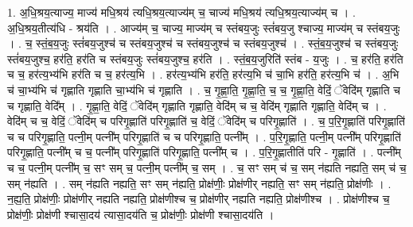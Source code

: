 \documentclass[17pt]{extarticle}
\begin{document}
1. अ॒धि॒श्रय॒त्याज्य॒ माज्य॑ मधि॒श्रय॑ त्यधि॒श्रय॒त्याज्य॑म् च॒ चाज्य॑ मधि॒श्रय॑ त्यधि॒श्रय॒त्याज्य॑म् च । . अ॒धि॒श्रय॒तीत्य॑धि - श्रय॑ति । . आज्य॑म् च॒ चाज्य॒ माज्य॑म् च स्तंबय॒जुः स्तं॑बय॒जु श्चाज्य॒ माज्य॑म् च स्तंबय॒जुः । . च॒ स्तं॒ब॒य॒जुः स्तं॑बय॒जुश्च॑ च स्तंबय॒जुश्च॑ च स्तंबय॒जुश्च॑ च स्तंबय॒जुश्च॑ । . स्तं॒ब॒य॒जुश्च॑ च स्तंबय॒जुः स्तं॑बय॒जुश्च॒ हर॑ति॒ हर॑ति च स्तंबय॒जुः स्तं॑बय॒जुश्च॒ हर॑ति । . स्तं॒ब॒य॒जुरिति॑ स्तंब - य॒जुः । . च॒ हर॑ति॒ हर॑ति च च॒ हर॑त्य॒भ्य॑भि हर॑ति च च॒ हर॑त्य॒भि । . हर॑त्य॒भ्य॑भि हर॑ति॒ हर॑त्य॒भि च॑ चा॒भि हर॑ति॒ हर॑त्य॒भि च॑ । . अ॒भि च॑ चा॒भ्य॑भि च॑ गृह्णाति गृह्णाति चा॒भ्य॑भि च॑ गृह्णाति । . च॒ गृ॒ह्णा॒ति॒ गृ॒ह्णा॒ति॒ च॒ च॒ गृ॒ह्णा॒ति॒ वेदिं॒ ॅवेदि॑म् गृह्णाति च च गृह्णाति॒ वेदि᳚म् । . गृ॒ह्णा॒ति॒ वेदिं॒ ॅवेदि॑म् गृह्णाति गृह्णाति॒ वेदि॑म् च च॒ वेदि॑म् गृह्णाति गृह्णाति॒ वेदि॑म् च । . वेदि॑म् च च॒ वेदिं॒ ॅवेदि॑म् च परिगृ॒ह्णाति॑ परिगृ॒ह्णाति॑ च॒ वेदिं॒ ॅवेदि॑म् च परिगृ॒ह्णाति॑ । . च॒ प॒रि॒गृ॒ह्णाति॑ परिगृ॒ह्णाति॑ च च परिगृ॒ह्णाति॒ पत्नी॒म् पत्नी᳚म् परिगृ॒ह्णाति॑ च च परिगृ॒ह्णाति॒ पत्नी᳚म् । . प॒रि॒गृ॒ह्णाति॒ पत्नी॒म् पत्नी᳚म् परिगृ॒ह्णाति॑ परिगृ॒ह्णाति॒ पत्नी᳚म् च च॒ पत्नी᳚म् परिगृ॒ह्णाति॑ परिगृ॒ह्णाति॒ पत्नी᳚म् च । . प॒रि॒गृ॒ह्णातीति॑ परि - गृ॒ह्णाति॑ । . पत्नी᳚म् च च॒ पत्नी॒म् पत्नी᳚म् च॒ सꣳ सम् च॒ पत्नी॒म् पत्नी᳚म् च॒ सम् । . च॒ सꣳ सम् च॑ च॒ सम् न॑ह्यति नह्यति॒ सम् च॑ च॒ सम् न॑ह्यति । . सम् न॑ह्यति नह्यति॒ सꣳ सम् न॑ह्यति॒ प्रोक्ष॑णीः॒ प्रोक्ष॑णीर् नह्यति॒ सꣳ सम् न॑ह्यति॒ प्रोक्ष॑णीः । . न॒ह्य॒ति॒ प्रोक्ष॑णीः॒ प्रोक्ष॑णीर् नह्यति नह्यति॒ प्रोक्ष॑णीश्च च॒ प्रोक्ष॑णीर् नह्यति नह्यति॒ प्रोक्ष॑णीश्च । . प्रोक्ष॑णीश्च च॒ प्रोक्ष॑णीः॒ प्रोक्ष॑णी श्चासा॒दय॑ त्यासा॒दय॑ति च॒ प्रोक्ष॑णीः॒ प्रोक्ष॑णी श्चासा॒दय॑ति । \newline
\end{document}

